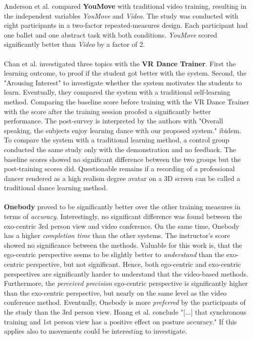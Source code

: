 Anderson et al. compared \textbf{YouMove} with traditional video training, resulting in the independent variables \textit{YouMove} and \textit{Video}. The study was conducted with eight participants in a two-factor repeated-measures design. Each participant had one ballet and one abstract task with both conditions. \textit{YouMove} scored significantly better than \textit{Video} by a factor of 2.\\ \\
Chan et al. \cite{Chan2010} investigated three topics with the \textbf{VR Dance Trainer}. First the learning outcome, to proof if the student got better with the system. Second, the "Arousing Interest" to investigate whether the system motivates the students to learn. Eventually, they compared the system with a traditional self-learning method. Comparing the baseline score before training with the VR Dance Trainer with the score after the training session proofed a significantly better performance. The post-survey is interpreted by the authors with "Overall speaking, the subjects enjoy learning dance with our proposed system." ibidem. To compare the system with a traditional learning method, a control group conducted the same study only with the demonstration and no feedback. The baseline scores showed no significant difference between the two groups but the post-training scores did. Questionable remains if a recording of a professional dancer rendered as a high realism degree avatar on a 3D screen can be called a traditional dance learning method.\\ \\
\textbf{Onebody} \cite{Hoang2016} proved to be significantly better over the other training measures in terms of \textit{accuracy}. Interestingly, no significant difference was found between the exo-centric 3rd person view and video conference. On the same time, Onebody has a higher \textit{completion time} than the other systems. The instructor's score showed no significance between the methods. Valuable for this work is, that the ego-centric perspective seems to be slightly better to \textit{understand} than the exo-centric perspective, but not significant. Hence, both ego-centric and exo-centric perspectives are significantly harder to understand that the video-based methods. Furthermore, the \textit{perceived precision} ego-centric perspective is significantly higher than the exo-centric perspective, but nearly on the same level as the video conference method. Eventually, Onebody is more \textit{preferred} by the participants of the study than the 3rd person view. Hoang et al. conclude "[...] that synchronous training and 1st person view has a positive effect on posture accuracy."\cite{Hoang2016} If this applies also to movements could be interesting to investigate.\\ \\
